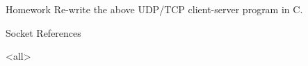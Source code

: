   \begin{frame}{Homework}
    Re-write the above UDP/TCP client-server program in C.
  \end{frame}

\begin{frame}{Socket References}
  \begin{refsection}
    \nocite{wiki:socket,hall2009beej}
    \printbibliography[heading=none]
  \end{refsection}
\end{frame}

\mode<all>
